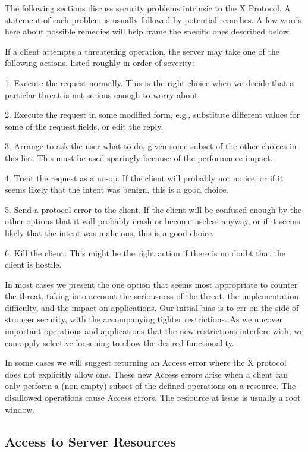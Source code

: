 The following sections discuss security problems intrinsic to the X
Protocol.  A statement of each problem is usually followed by
potential remedies.  A few words here about possible remedies will
help frame the specific ones described below.

If a client attempts a threatening operation, the server may take one
of the following actions, listed roughly in order of severity:

1. Execute the request normally.  This is the right choice when we
decide that a particlar threat is not serious enough to worry about.

2. Execute the request in some modified form, e.g., substitute
different values for some of the request fields, or edit the reply.

3. Arrange to ask the user what to do, given some subset of the other
choices in this list.  This must be used sparingly because of the
performance impact.

4. Treat the request as a no-op.  If the client will probably not
notice, or if it seems likely that the intent was benign, this is a
good choice.
 
5. Send a protocol error to the client.  If the client will be
confused enough by the other options that it will probably crash or
become useless anyway, or if it seems likely that the intent was
malicious, this is a good choice.

6. Kill the client.  This might be the right action if there is no
doubt that the client is hostile.

In most cases we present the one option that seems most appropriate to
counter the threat, taking into account the seriousness of the threat,
the implementation difficulty, and the impact on applications.  Our
initial bias is to err on the side of stronger security, with the
accompanying tighter restrictions.  As we uncover important operations
and applications that the new restrictions interfere with, we can apply
selective loosening to allow the desired functionality.

In some cases we will suggest returning an Access error where the X
protocol does not explicitly allow one.  These new Access errors arise
when a client can only perform a (non-empty) subset of the defined
operations on a resource.  The disallowed operations cause Access
errors.  The resiource at issue is usually a root window.



\subsection{Access to Server Resources}

